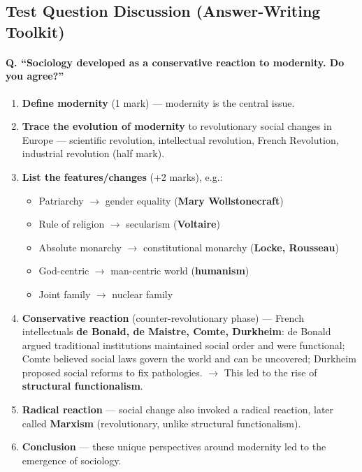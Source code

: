 \sectiondivider

\subsection{Test Question Discussion (Answer-Writing Toolkit)}

\paragraph{Q. ``Sociology developed as a conservative reaction to modernity. Do you agree?''}
\begin{enumerate}
\item \textbf{Define modernity} (1 mark) --- modernity is the central issue.
\item \textbf{Trace the evolution of modernity} to revolutionary social changes in Europe --- scientific revolution, intellectual revolution, French Revolution, industrial revolution (half mark).
\item \textbf{List the features/changes} (+2 marks), e.g.:
\begin{itemize}
\item Patriarchy $\rightarrow$ gender equality (\textbf{Mary Wollstonecraft})
\item Rule of religion $\rightarrow$ secularism (\textbf{Voltaire})
\item Absolute monarchy $\rightarrow$ constitutional monarchy (\textbf{Locke, Rousseau})
\item God-centric $\rightarrow$ man-centric world (\textbf{humanism})
\item Joint family $\rightarrow$ nuclear family
\end{itemize}
\item \textbf{Conservative reaction} (counter-revolutionary phase) --- French intellectuals \textbf{de Bonald, de Maistre, Comte, Durkheim}: de Bonald argued traditional institutions maintained social order and were functional; Comte believed social laws govern the world and can be uncovered; Durkheim proposed social reforms to fix pathologies. $\rightarrow$ This led to the rise of \textbf{structural functionalism}.
\item \textbf{Radical reaction} --- social change also invoked a radical reaction, later called \textbf{Marxism} (revolutionary, unlike structural functionalism).
\item \textbf{Conclusion} --- these unique perspectives around modernity led to the emergence of sociology.
\end{enumerate}

